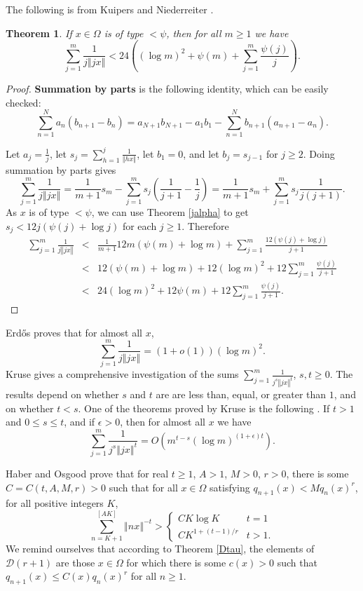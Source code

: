 \documentclass{article}
\newcommand{\norm}[1]{\left\Vert #1 \right\Vert}
\newtheorem{theorem}{Theorem}
\begin{document}
The following is from Kuipers and Niederreiter \cite[p.~131, Exercise 3.12]{kuipers}.

\begin{theorem}
If $x \in \Omega$ is of type $<\psi$, then for all $m \geq 1$ we have
\[
\sum_{j=1}^m \frac{1}{j\norm{jx}}<24\left((\log m)^2 + \psi(m)+\sum_{j=1}^m \frac{\psi(j)}{j} \right).
\]
\label{hhalpha}
\end{theorem}
\begin{proof}
\textbf{Summation by parts} is the following identity, which can be easily checked:
\[
\sum_{n=1}^N a_n(b_{n+1}-b_n)=a_{N+1}b_{N+1}-a_1 b_1 - \sum_{n=1}^N b_{n+1}(a_{n+1}-a_n).
\]

Let $a_j=\frac{1}{j}$, let $s_j=\sum_{h=1}^j \frac{1}{\norm{h x}}$, let $b_1=0$, and let $b_j=s_{j-1}$ for $j  \geq 2$. Doing summation by parts gives
\[
\sum_{j=1}^m  \frac{1}{j\norm{jx}}=\frac{1}{m+1} s_m-\sum_{j=1}^m s_j \left(\frac{1}{j+1}-\frac{1}{j}\right)
=\frac{1}{m+1} s_m+\sum_{j=1}^m s_j \frac{1}{j(j+1)}.
\]
As $x$ is of type $<\psi$, we can use Theorem \ref{jalpha} to get $s_j<12j(\psi(j)+\log j)$ for each $j \geq 1$. Therefore
\begin{eqnarray*}
\sum_{j=1}^m  \frac{1}{j\norm{jx}}&<&\frac{1}{m+1}12m(\psi(m)+\log m)+\sum_{j=1}^m \frac{12(\psi(j)+\log j)}{j+1}\\
&<&12(\psi(m)+\log m)+12 (\log m)^2+12\sum_{j=1}^m \frac{\psi(j)}{j+1}\\
&<&24(\log m)^2 + 12\psi(m)+12\sum_{j=1}^m \frac{\psi(j)}{j+1}.
\end{eqnarray*}
\end{proof}

Erd\H os \cite{remarks} proves that for almost all $x$,
\[
\sum_{j=1}^m \frac{1}{j\norm{jx}}=(1+o(1))(\log m)^2.
\]
Kruse \cite{MR0207642} gives a comprehensive investigation of the sums $\sum_{j=1}^m \frac{1}{j^s \norm{jx}^t}$, $s,t \geq 0$. The results depend on whether $s$ and $t$ are are less than, equal, or greater than $1$, and on whether $t<s$. One of the theorems proved by Kruse is the following \cite[p.~260, Theorem 7]{MR0207642}. If $t>1$ and $0 \leq s \leq t$, and if $\epsilon>0$, then for almost all $x$ we have
\[
\sum_{j=1}^m \frac{1}{j^s \norm{jx}^t} = O\left(m^{t-s} (\log m)^{(1+\epsilon)t} \right).
\]

Haber and Osgood  \cite[p.~387, Theorem 1]{haber} prove that for real $t \geq 1$, $A>1$, $M>0$, $r>0$, there is some $C=C(t,A,M,r)>0$ such that for
all $x \in \Omega$ satisfying $q_{n+1}(x)<M q_n(x)^r$, for all positive integers $K$,
\[
\sum_{n=K+1}^{[AK]} \norm{nx}^{-t} > \begin{cases}
CK \log K&t=1\\
CK^{1+(t-1)/r}&t>1.
\end{cases}
\]
We remind ourselves that according to Theorem \ref{Dtau}, the elements of $\mathcal{D}(r+1)$ are those
$x \in \Omega$ for which there is some $c(x)>0$ such that $q_{n+1}(x) \leq C(x) q_n(x)^r$ for all $n \geq 1$. 
\end{document}
